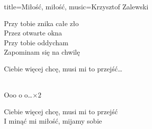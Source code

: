 \begin{song}{title={Miłość, miłość}, music={Krzysztof Zalewski}}
\begin{multicols}{2}
\begin{verse*}
        Przy tobie znika całe zło \\
        Przez otwarte okna \\
        Przy tobie oddycham \\
        Zapominam się na chwilę
    \end{verse*}
    \begin{chorus}
        Ciebie więcej chcę, musi mi to przejść\ldots
    \end{chorus}
    \begin{interlude}
            \\
        Ooo o o\ldots $\times 2$
    \end{interlude}
    \begin{chorus}
        Ciebie więcej chcę, musi mi to przejść \\
        I minąć mi miłość, mijamy sobie
    \end{chorus}
    \begin{chorus*}
           
    \end{chorus*}
    \end{multicols}
\end{song}

